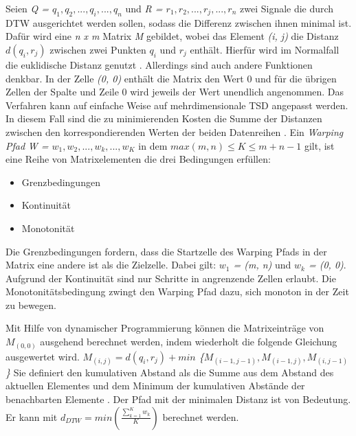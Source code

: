 Seien \emph{Q = $q_{1}, q_{2}, ... , q_{i}, ... , q_{n}$} und \emph{R = $r_{1}, r_{2}, ... , r_{j}, ... , r_{n}$}
zwei Signale die durch \ac{DTW} ausgerichtet werden sollen, sodass die Differenz zwischen ihnen minimal ist.
Dafür wird eine \emph{n x m} Matrix \emph{M} gebildet, wobei das Element \emph{(i, j)} die Distanz \emph{$d(q_{i}, r_{j})$}
zwischen zwei Punkten \emph{$q_{i}$} und \emph{$r_{j}$} enthält.
Hierfür wird im Normalfall die euklidische Distanz genutzt \citep{warren_liao_clustering_2005}.
Allerdings sind auch andere Funktionen denkbar.
In der Zelle \emph{(0, 0)} enthält die Matrix den Wert 0
und für die übrigen Zellen der Spalte und Zeile 0 wird jeweils der Wert unendlich angenommen.
Das Verfahren kann auf einfache Weise auf mehrdimensionale \ac{TSD} angepasst werden.
In diesem Fall sind die zu minimierenden Kosten die Summe
der Distanzen zwischen den korrespondierenden Werten der beiden Datenreihen \citep{mohammadzade_dynamic_2021}.
Ein \emph{Warping Pfad} \emph{W = $w_{1}, w_{2}, ... , w_{k}, ... , w_{K}$} in dem \emph{$max(m, n) \le K \le m + n - 1$} gilt,
ist eine Reihe von Matrixelementen die drei Bedingungen erfüllen:
\begin{itemize}
    \item Grenzbedingungen
    \item Kontinuität
    \item Monotonität
\end{itemize}
Die Grenzbedingungen fordern, dass die Startzelle des Warping Pfads in der Matrix eine andere ist als die Zielzelle.
Dabei gilt: \emph{$w_{1}$ = (m, n)} und \emph{$w_{k}$ = (0, 0)}.
Aufgrund der Kontinuität sind nur Schritte in angrenzende Zellen erlaubt.
Die Monotonitätsbedingung zwingt den Warping Pfad dazu, sich monoton in der Zeit zu bewegen.

Mit Hilfe von dynamischer Programmierung können die Matrixeinträge von \emph{$M_{(0, 0)}$} ausgehend berechnet werden,
indem wiederholt die folgende Gleichung ausgewertet wird.
\emph{$ M_{(i, j)} = d(q_{i}, r_{j}) + min $ \{$M_{(i - 1, j - 1)}, M_{(i - 1, j)}, M_{(i, j - 1)} $\}}
Sie definiert den kumulativen Abstand als die Summe aus dem Abstand des aktuellen Elementes
und dem Minimum der kumulativen Abstände der benachbarten Elemente \citep{warren_liao_clustering_2005}.
Der Pfad mit der minimalen Distanz ist von Bedeutung.
Er kann mit \emph{$d_{DTW} = min(\frac{\sum_{k = 1}^{K}w_{k}}{K})$} berechnet werden.


